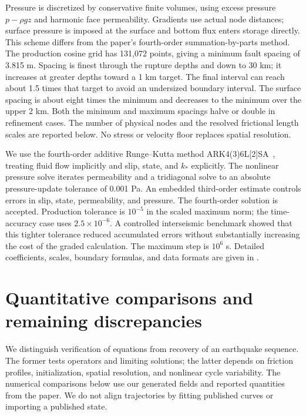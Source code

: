 \documentclass[11pt]{article}
\newcommand{\code}[1]{\texttt{\detokenize{#1}}}
\begin{document}
Pressure is discretized by conservative finite volumes, using excess pressure
$p-\rho gz$ and harmonic face permeability. Gradients use actual node distances;
surface pressure is imposed at the surface and bottom flux enters storage directly.
This scheme differs from the paper's fourth-order summation-by-parts method.
The production cosine grid has 131,072 points, giving a minimum fault spacing
of 3.815 m. Spacing is finest through the rupture depths and down to 30 km;
it increases at greater depths toward a 1 km target. The final interval can
reach about 1.5 times that target to avoid an undersized boundary interval.
The surface spacing is about
eight times the minimum and decreases to the minimum over the upper 2 km.
Both the minimum and maximum spacings halve or double in refinement cases.
The number of physical nodes and the resolved frictional length scales are
reported below. No stress or velocity floor replaces spatial resolution.

We use the fourth-order additive Runge--Kutta method ARK4(3)6L[2]SA\ \cite{kennedy},
treating fluid flow implicitly and slip, state, and $k_*$ explicitly. The nonlinear pressure
solve iterates permeability and a tridiagonal solve to an absolute pressure-update
tolerance of 0.001 Pa. An embedded third-order estimate controls errors in slip,
state, permeability, and pressure. The fourth-order solution is accepted. Production tolerance is
$10^{-5}$ in the scaled maximum norm; the time-accuracy case uses
$2.5\times10^{-6}$. A controlled interseismic benchmark showed that this tighter
tolerance reduced accumulated errors without substantially increasing the cost
of the graded calculation. The maximum step is $10^6$ s. Detailed coefficients, scales,
boundary formulas, and data formats are given in \code{documentation/numerics.md}.



\section{Quantitative comparisons and remaining discrepancies}
We distinguish verification of equations from recovery of an earthquake sequence.
The former tests operators and limiting solutions; the latter depends on
friction profiles, initialization, spatial resolution, and nonlinear cycle
variability. The numerical comparisons below use our generated fields and
reported quantities from the paper. We do not align trajectories by fitting
published curves or importing a published state.
\end{document}
